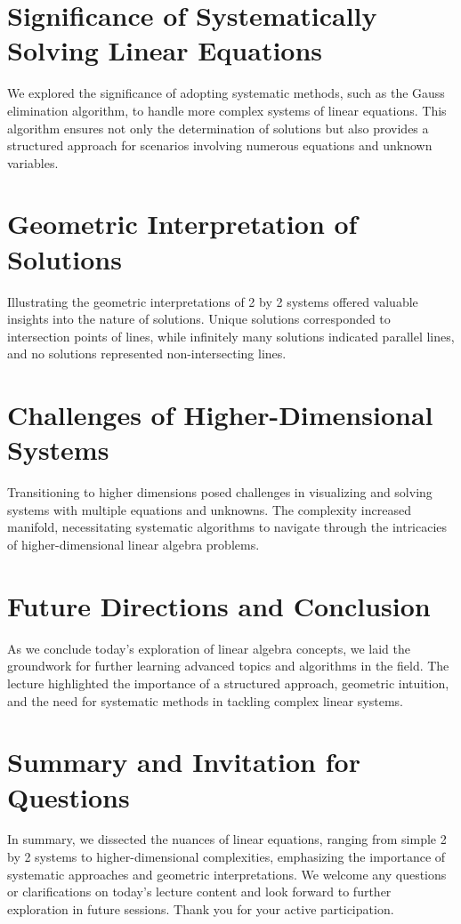 \documentclass{article}
\begin{document}
\section{Significance of Systematically Solving Linear Equations}
We explored the significance of adopting systematic methods, such as the Gauss elimination algorithm, to handle more complex systems of linear equations. This algorithm ensures not only the determination of solutions but also provides a structured approach for scenarios involving numerous equations and unknown variables.

\section{Geometric Interpretation of Solutions}
Illustrating the geometric interpretations of 2 by 2 systems offered valuable insights into the nature of solutions. Unique solutions corresponded to intersection points of lines, while infinitely many solutions indicated parallel lines, and no solutions represented non-intersecting lines.

\section{Challenges of Higher-Dimensional Systems}
Transitioning to higher dimensions posed challenges in visualizing and solving systems with multiple equations and unknowns. The complexity increased manifold, necessitating systematic algorithms to navigate through the intricacies of higher-dimensional linear algebra problems.

\section{Future Directions and Conclusion}
As we conclude today's exploration of linear algebra concepts, we laid the groundwork for further learning advanced topics and algorithms in the field. The lecture highlighted the importance of a structured approach, geometric intuition, and the need for systematic methods in tackling complex linear systems.

\section{Summary and Invitation for Questions}
In summary, we dissected the nuances of linear equations, ranging from simple 2 by 2 systems to higher-dimensional complexities, emphasizing the importance of systematic approaches and geometric interpretations. We welcome any questions or clarifications on today's lecture content and look forward to further exploration in future sessions. Thank you for your active participation.
\end{document}
